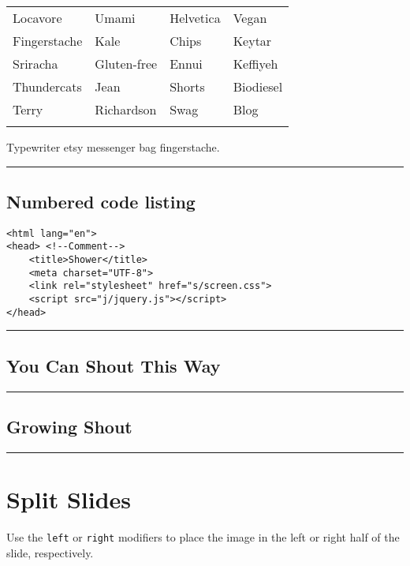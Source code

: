 \documentclass[]{article}
\begin{document}
\begin{longtable}[c]{@{}llll@{}}
\toprule\addlinespace
Locavore & Umami & Helvetica & Vegan
\\\addlinespace
\midrule\endhead
Fingerstache & Kale & Chips & Keytar
\\\addlinespace
Sriracha & Gluten-free & Ennui & Keffiyeh
\\\addlinespace
Thundercats & Jean & Shorts & Biodiesel
\\\addlinespace
Terry & Richardson & Swag & Blog
\\\addlinespace
\bottomrule
\end{longtable}

Typewriter etsy messenger bag fingerstache.

\begin{center}\rule{3in}{0.4pt}\end{center}

\subsection{Numbered code listing}\label{numbered-code-listing}

\begin{verbatim}
<html lang="en">
<head> <!--Comment-->
    <title>Shower</title>
    <meta charset="UTF-8">
    <link rel="stylesheet" href="s/screen.css">
    <script src="j/jquery.js"></script>
</head>
\end{verbatim}

\begin{center}\rule{3in}{0.4pt}\end{center}

\subsection{You Can Shout This Way}\label{you-can-shout-this-way}

\begin{center}\rule{3in}{0.4pt}\end{center}

\subsection{Growing Shout}\label{growing-shout}

\begin{center}\rule{3in}{0.4pt}\end{center}

\section{Split Slides}\label{split-slides}

Use the \texttt{left} or \texttt{right} modifiers to place the image in
the left or right half of the slide, respectively.
\end{document}
